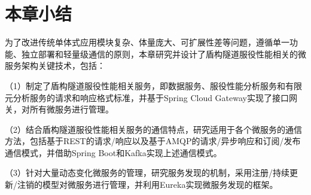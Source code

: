 \section{本章小结}

为了改进传统单体式应用模块复杂、体量庞大、可扩展性差等问题，遵循单一功能、独立部署和轻量级通信的原则，本章研究并设计了盾构隧道服役性能相关的微服务架构关键技术，包括：

（1）制定了盾构隧道服役性能相关服务，即数据服务、服役性能分析服务和有限元分析服务的请求和响应格式标准，并基于Spring Cloud Gateway实现了接口网关，对所有微服务进行管理。

（2）结合盾构隧道服役性能相关服务的通信特点，研究适用于各个微服务的通信方法，包括基于REST的请求/响应以及基于AMQP的请求/异步响应和订阅/发布通信模式，并借助Spring Boot和Kafka实现上述通信模式。

（3）针对大量动态变化微服务的管理，研究服务发现的机制，采用注册/持续更新/注销的模型对微服务进行管理，并利用Eureka实现微服务发现的框架。